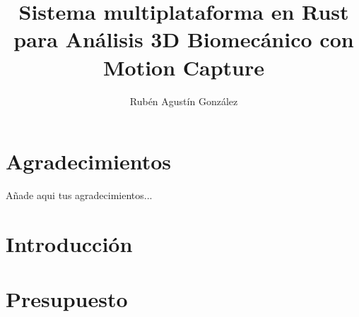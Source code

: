 
\newcommand{\pfg}{Proyecto Fin de Grado }

\title{Sistema multiplataforma en Rust para Análisis 3D 
Biomecánico con Motion Capture}
\author{Rubén Agustín González}



\hypersetup{pageanchor=false}
\begin{titlepage}
    \thispagestyle{empty}
    
\end{titlepage}

\listoftodos

\newpage
\begin{abstract}
    
\end{abstract}
\renewcommand{\abstractname}{Abstract} %
\newpage
\vspace{10cm}
\begin{abstract}
    
\end{abstract}

\chapter*{Agradecimientos}
\noindent Añade aqui tus agradecimientos...

\hypersetup{pageanchor=false}
\hypersetup{linkcolor=black}
\tableofcontents

\listoffigures
\listoftables
\lstlistoflistings




\chapter{Introducción}
\label{sec:cap1}





\chapter{Presupuesto}
\label{sec:cap4}


